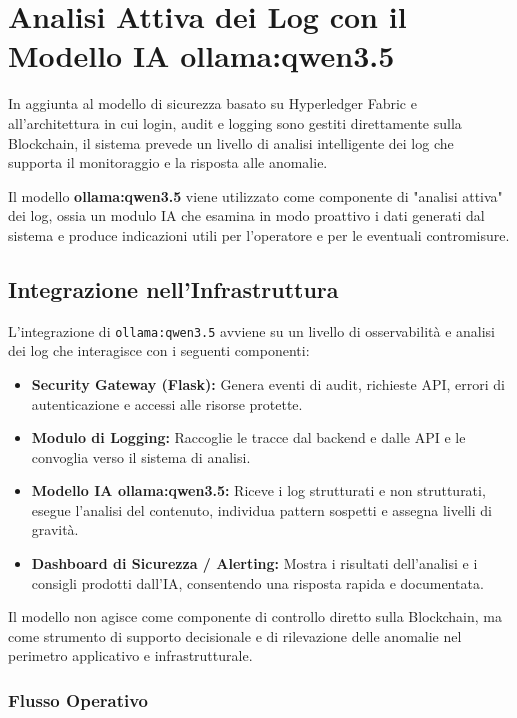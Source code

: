 \chapter{Analisi Attiva dei Log con il Modello IA ollama:qwen3.5}

In aggiunta al modello di sicurezza basato su Hyperledger Fabric e all'architettura in cui login, audit e logging sono gestiti direttamente sulla Blockchain, il sistema prevede un livello di analisi intelligente dei log che supporta il monitoraggio e la risposta alle anomalie.

Il modello \textbf{ollama:qwen3.5} viene utilizzato come componente di "analisi attiva" dei log, ossia un modulo IA che esamina in modo proattivo i dati generati dal sistema e produce indicazioni utili per l'operatore e per le eventuali contromisure.

\section{Integrazione nell'Infrastruttura}

L'integrazione di \texttt{ollama:qwen3.5} avviene su un livello di osservabilità e analisi dei log che interagisce con i seguenti componenti:

\begin{itemize}
    \item \textbf{Security Gateway (Flask):} Genera eventi di audit, richieste API, errori di autenticazione e accessi alle risorse protette.
    \item \textbf{Modulo di Logging:} Raccoglie le tracce dal backend e dalle API e le convoglia verso il sistema di analisi.
    \item \textbf{Modello IA ollama:qwen3.5:} Riceve i log strutturati e non strutturati, esegue l'analisi del contenuto, individua pattern sospetti e assegna livelli di gravità.
    \item \textbf{Dashboard di Sicurezza / Alerting:} Mostra i risultati dell'analisi e i consigli prodotti dall'IA, consentendo una risposta rapida e documentata.
\end{itemize}

Il modello non agisce come componente di controllo diretto sulla Blockchain, ma come strumento di supporto decisionale e di rilevazione delle anomalie nel perimetro applicativo e infrastrutturale.

\newpage
\subsection{Flusso Operativo}


